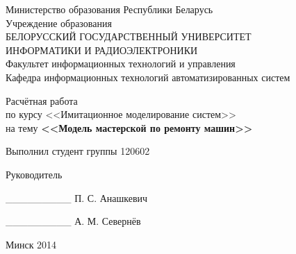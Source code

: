 \begin{titlepage}
\thispagestyle{empty}
\setlength{\parindent}{0ex} %

\begin{center}
  Министерство образования Республики Беларусь \\
  \smallskip
  Учреждение образования \\
  БЕЛОРУССКИЙ ГОСУДАРСТВЕННЫЙ УНИВЕРСИТЕТ \\
  ИНФОРМАТИКИ И РАДИОЭЛЕКТРОНИКИ \\
  \smallskip
  Факультет информационных технологий и управления \\
  \smallskip
  Кафедра информационных технологий автоматизированных систем
\end{center}

\vspace{50mm}

\begin{center}
  Расчётная работа \\
  по курсу <<Имитационное моделирование систем>> \\
  на тему \textbf{<<Модель мастерской по ремонту машин>>} \\
\end{center}

\vspace{60mm}

\begin{minipage}{.55\linewidth}
    Выполнил студент группы 120602

    \smallskip

    Руководитель
\end{minipage}
\hfill
\begin{minipage}{.4\linewidth}
  \begin{flushright}
    \_\_\_\_\_\_\_\_\_ \hspace{0.6mm} П. С. Анашкевич

    \smallskip

    \_\_\_\_\_\_\_\_\_ \hspace{4mm} А. М. Севернёв
  \end{flushright}
\end{minipage}

\vspace{45mm}
\begin{center}
  Минск 2014
\end{center}

\setlength{\parindent}{5ex} %
\end{titlepage}
